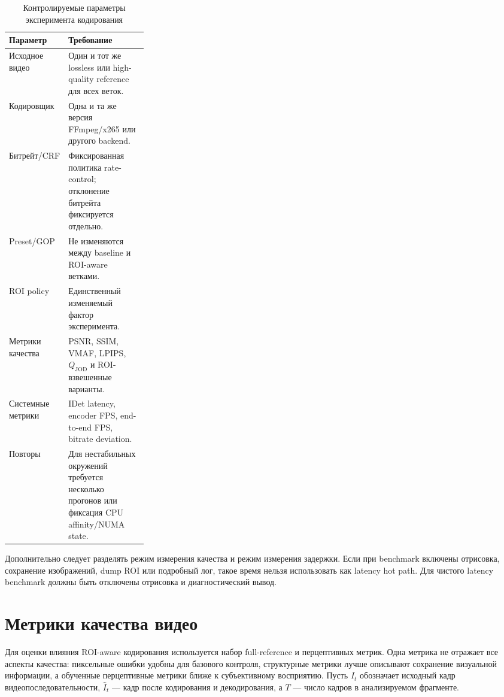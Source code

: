 \documentclass[12pt,a4paper,oneside,openany]{report}
\begin{document}
\begin{table}[H]\centering\caption{Контролируемые параметры эксперимента кодирования}\label{tab:encoding_control_variables}\small\begin{tabularx}{\linewidth}{@{}P{0.27\linewidth}Y@{}}\toprule
Параметр & Требование \\
\midrule
Исходное видео & Один и тот же lossless или high-quality reference для всех веток. \\
Кодировщик & Одна и та же версия FFmpeg/x265 или другого backend. \\
Битрейт/CRF & Фиксированная политика rate-control; отклонение битрейта фиксируется отдельно. \\
Preset/GOP & Не изменяются между baseline и ROI-aware ветками. \\
ROI policy & Единственный изменяемый фактор эксперимента. \\
Метрики качества & PSNR, SSIM, VMAF, LPIPS, $Q_{\operatorname{JOD}}$ и ROI-взвешенные варианты. \\
Системные метрики & IDet latency, encoder FPS, end-to-end FPS, bitrate deviation. \\
Повторы & Для нестабильных окружений требуется несколько прогонов или фиксация CPU affinity/NUMA state. \\
\bottomrule\end{tabularx}
\end{table}

Дополнительно следует разделять режим измерения качества и режим измерения задержки. Если при benchmark включены отрисовка, сохранение изображений, dump ROI или подробный лог, такое время нельзя использовать как latency hot path. Для чистого latency benchmark должны быть отключены отрисовка и диагностический вывод.

\section{Метрики качества видео}

Для оценки влияния ROI-aware кодирования используется набор full-reference и перцептивных метрик. Одна метрика не отражает все аспекты качества: пиксельные ошибки удобны для базового контроля, структурные метрики лучше описывают сохранение визуальной информации, а обученные перцептивные метрики ближе к субъективному восприятию. Пусть $I_t$ обозначает исходный кадр видеопоследовательности, $\hat{I}_t$ --- кадр после кодирования и декодирования, а $T$ --- число кадров в анализируемом фрагменте.
\end{document}
